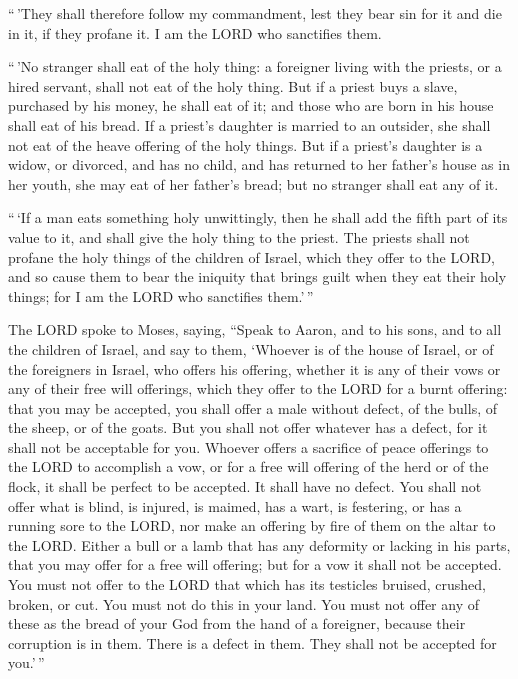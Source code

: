  ``\,'They shall therefore follow my commandment, lest
they bear sin for it and die in it, if they profane it. I am the LORD
who sanctifies them.

 ``\,'No stranger shall eat of the holy thing: a
foreigner living with the priests, or a hired servant, shall not eat of
the holy thing.  But if a priest buys a slave, purchased
by his money, he shall eat of it; and those who are born in his house
shall eat of his bread.  If a priest's daughter is
married to an outsider, she shall not eat of the heave offering of the
holy things.  But if a priest's daughter is a widow, or
divorced, and has no child, and has returned to her father's house as in
her youth, she may eat of her father's bread; but no stranger shall eat
any of it.

 ``\,`If a man eats something holy unwittingly, then he
shall add the fifth part of its value to it, and shall give the holy
thing to the priest.  The priests shall not profane the
holy things of the children of Israel, which they offer to the LORD,
 and so cause them to bear the iniquity that brings guilt
when they eat their holy things; for I am the LORD who sanctifies
them.'\,''

 The LORD spoke to Moses, saying,  ``Speak
to Aaron, and to his sons, and to all the children of Israel, and say to
them, `Whoever is of the house of Israel, or of the foreigners in
Israel, who offers his offering, whether it is any of their vows or any
of their free will offerings, which they offer to the LORD for a burnt
offering:  that you may be accepted, you shall offer a
male without defect, of the bulls, of the sheep, or of the goats.
 But you shall not offer whatever has a defect, for it
shall not be acceptable for you.  Whoever offers a
sacrifice of peace offerings to the LORD to accomplish a vow, or for a
free will offering of the herd or of the flock, it shall be perfect to
be accepted. It shall have no defect.  You shall not
offer what is blind, is injured, is maimed, has a wart, is festering, or
has a running sore to the LORD, nor make an offering by fire of them on
the altar to the LORD.  Either a bull or a lamb that has
any deformity or lacking in his parts, that you may offer for a free
will offering; but for a vow it shall not be accepted. 
You must not offer to the LORD that which has its testicles bruised,
crushed, broken, or cut. You must not do this in your land.
 You must not offer any of these as the bread of your God
from the hand of a foreigner, because their corruption is in them. There
is a defect in them. They shall not be accepted for you.'\,''

